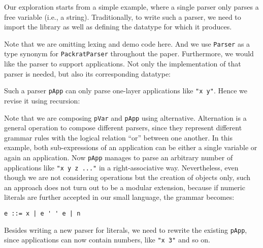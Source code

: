 Our exploration starts from a simple example, where a single parser only parses a free variable (i.e., a string). Traditionally, to write
such a parser, we need to import the library as
well as defining the datatype for which it produces.


Note that we are omitting lexing and demo code here. And we use \lstinline{Parser} as a type synonym for \lstinline{PackratParser} throughout the paper. Furthermore, we would like the parser to support applications.
Not only the implementation of that parser is needed, but also its corresponding datatype:


Such a parser \lstinline{pApp} can only parse one-layer applications like \lstinline{"x y"}. Hence we revise it using recursion:


Note that we are composing \lstinline{pVar} and \lstinline{pApp} using alternative. Alternation is a general operation to compose different parsers, since they represent different grammar rules with the logical relation ``or'' between one another. In this example, both sub-expressions of an application can be either a single variable or again an application. Now \lstinline{pApp} manages to parse an arbitrary number of applications like \lstinline{"x y z ..."} in a right-associative way.
Nevertheless, even though we are not considering operations but the creation of objects only, such an approach does not turn out to be a modular extension, because if numeric literals are further accepted in our small language, the grammar becomes:
\begin{lstlisting}
e ::= x | e ' ' e | n
\end{lstlisting}
Besides writing a new parser for literals, we need to rewrite the existing \lstinline{pApp}, since applications can now contain numbers, like \lstinline{"x 3"} and so on.


